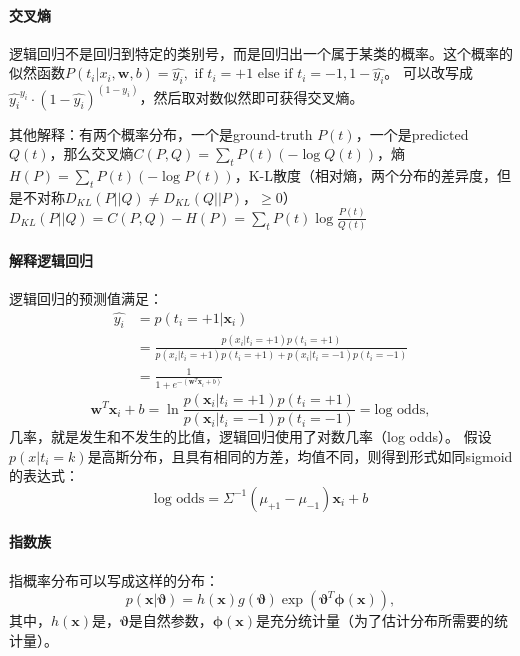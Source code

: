 \paragraph{交叉熵} 逻辑回归不是回归到特定的类别号，而是回归出一个属于某类的概率。这个概率的似然函数$P(t_i|x_i,\bm w,b) = \hat{y_i},\text{ if }t_i = +1\text{ else if }t_i = -1, 1 - \hat{y_i}$。
可以改写成$\hat{y_i}^{y_i}\cdot(1-\hat{y_i})^{(1-y_i)}$，然后取对数似然即可获得交叉熵。

其他解释：有两个概率分布，一个是ground-truth $P(t)$，一个是predicted $Q(t)$，那么交叉熵$C(P,Q) = \sum_tP(t)(-\log Q(t))$，熵$H(P)=\sum_tP(t)(-\log P(t))$，K-L散度（相对熵，两个分布的差异度，但是不对称$D_{KL}(P||Q) \neq D_{KL}(Q||P)$，$\ge 0$）$D_{KL}(P||Q) = C(P,Q) - H(P) = \sum_tP(t)\log{\frac{P(t)}{Q(t)}}$

\paragraph{解释逻辑回归}逻辑回归的预测值满足：
$$
\begin{array}{ll}
\hat{y_i} &= p(t_i = +1 |\bm x_i) \\
&= \frac{p(x_i|t_i=+1)p(t_i=+1)}{p(x_i|t_i=+1)p(t_i=+1) + p(x_i|t_i=-1)p(t_i=-1)} \\
& = \frac{1}{1+e^{-(\bm w^T\bm x_i + b)}}
\end{array}
$$
$$\bm w^T\bm x_i + b = \ln \frac{p(\bm x_i| t_i = +1)p(t_i = +1)}{p(\bm x_i| t_i = -1)p(t_i = -1)} = \text{log odds},$$
几率，就是发生和不发生的比值，逻辑回归使用了对数几率（log odds）。
假设$p(x|t_i=k)$是高斯分布，且具有相同的方差，均值不同，则得到形式如同sigmoid的表达式：
$$\text{log odds} = \Sigma^{-1}(\mu_{+1}-\mu_{-1})\bm x_i + b$$

\paragraph{指数族} 指概率分布可以写成这样的分布：
$$p(\bm x|\bm \vartheta) = h(\bm x)g(\bm\vartheta)\exp(\bm\vartheta^T\bm\phi(\bm x)),$$
其中，$h(\bm x)$是，$\bm\vartheta$是自然参数，$\bm\phi(\bm x)$是充分统计量（为了估计分布所需要的统计量）。

